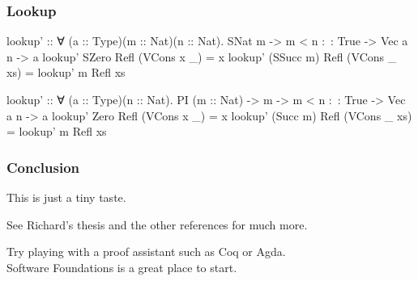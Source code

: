 \documentclass{beamer}
\begin{document}
\begin{frame}[fragile]\frametitle{Lookup}
\begin{semiverbatim}
lookup' :: ∀ (a :: Type)(m :: Nat)(n :: Nat).
           SNat m -> m < n :~: True -> Vec a n -> a
lookup' SZero     Refl (VCons x _)  = x
lookup' (SSucc m) Refl (VCons _ xs) = lookup' m Refl xs

lookup' :: ∀ (a :: Type)(n :: Nat). PI (m :: Nat) ->
           m -> m < n :~: True -> Vec a n -> a
lookup' Zero     Refl (VCons x _)  = x
lookup' (Succ m) Refl (VCons _ xs) = lookup' m Refl xs

\end{semiverbatim}
\end{frame}

\begin{frame}\frametitle{Conclusion}
This is just a tiny taste.
\bigskip  

See Richard's thesis and the other references for much more.  
\bigskip  

Try playing with a proof assistant such as Coq or Agda.\\
Software Foundations is a great place to start.
\end{frame}
\end{document}
